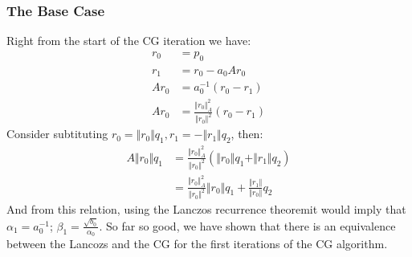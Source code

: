 \documentclass[]{article}
\theoremstyle{definition}
\begin{document}
        \subsubsection{The Base Case}
            Right from the start of the CG iteration we have: 
            \begin{align}
                r_0 &= p_0
                \\
                r_1 &= r_0 - a_0Ar_0
                \\
                Ar_0 &= a_0^{-1}(r_0 - r_1)
                \\
                Ar_0 &= \frac{\Vert r_0\Vert_A^2}{\Vert r_0\Vert^2}(r_0 - r_1)
            \end{align}
            Consider subtituting $r_0 = \Vert r_0\Vert q_1, r_1 = -\Vert r_1\Vert q_2$, then: 
            \begin{align}
                A\Vert r_0\Vert q_1 
                &= \frac{\Vert r_0\Vert_A^2}{\Vert r_0\Vert^2}\left(
                    \Vert r_0\Vert q_1 + \Vert r_1\Vert q_2
                \right)
                \\
                &= 
                \frac{\Vert r_0\Vert_A^2}{\Vert r_0\Vert^2}\Vert r_0\Vert q_1 + 
                    \frac{\Vert r_1\Vert}{\Vert r_0\Vert} q_2
            \end{align}
            And from this relation, using the Lanczos recurrence theoremit would imply that $\alpha_1 = a_0^{-1}$; $\beta_1 = \frac{\sqrt{b_0}}{\alpha_0}$. So far so good, we have shown that there is an equivalence between the Lancozs and the CG for the first iterations of the CG algorithm. 
\end{document}
